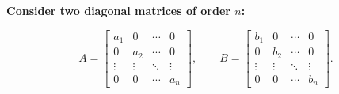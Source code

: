 
\item \textbf{Consider two diagonal matrices of order $n$:}

$$
A=
\begin{bmatrix}
    a_1 & 0 & \cdots & 0 \\
    0 & a_2 & \cdots & 0 \\
    \vdots & \vdots & \ddots & \vdots \\
    0 & 0 & \cdots & a_n
\end{bmatrix},
\qquad
B=
\begin{bmatrix}
    b_1 & 0 & \cdots & 0 \\
    0 & b_2 & \cdots & 0 \\
    \vdots & \vdots & \ddots & \vdots \\
    0 & 0 & \cdots & b_n
\end{bmatrix}.
$$

